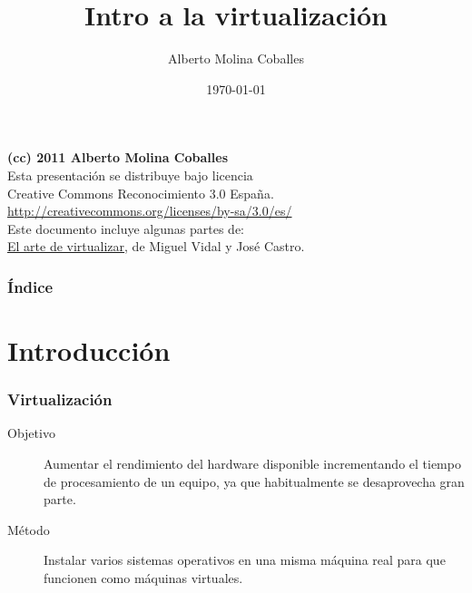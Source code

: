 \documentclass{beamer}
\author{Alberto Molina Coballes}
\title{Intro a la virtualización}
\institute{IES Gonzalo Nazareno}
\date{\today}
\begin{document}
\begin{frame}[t,plain]
\titlepage
\end{frame}

\begin{frame}
  \begin{flushright}
    \textbf{(cc) 2011 Alberto Molina Coballes}\\
    Esta presentación se distribuye bajo licencia\\
    Creative Commons Reconocimiento 3.0 España.\\
    \url{http://creativecommons.org/licenses/by-sa/3.0/es/}\\
\vspace{1cm}
    Este documento incluye algunas partes de:\\
    \href{http://moodle.libresoft.es/pluginfile.php/131/mod_resource/content/6/virt1.pdf}{El arte de virtualizar}, de Miguel Vidal y José Castro.\\
  \end{flushright}
\end{frame}

\begin{frame}\frametitle{Índice}
\tableofcontents
\end{frame}

\section{Introducción}
\begin{frame}
  \frametitle{Virtualización}
    \begin{description}
    \item [Objetivo] Aumentar el rendimiento del hardware disponible
      incrementando el tiempo de procesamiento de un equipo, ya que
      habitualmente se desaprovecha gran parte.
    \item [Método] Instalar varios sistemas operativos en una misma
      máquina real para que funcionen como máquinas virtuales.
    \end{description}
\end{frame}
\end{document}

